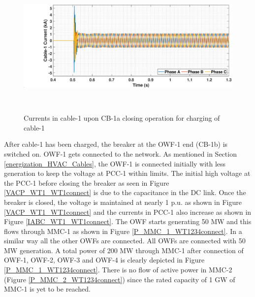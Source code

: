 \begin{figure}[H]
    \includegraphics[height = 7cm,width = \textwidth]{Diagrams/Chapter_5/IABC_Cab1_Cab1charg.eps}
    \caption{Currents in cable-1 upon CB-1a closing operation for charging of cable-1}
    \label{fig:IABC_Cab1_Cab1charg}
\end{figure}

After cable-1 has been charged, the breaker at the \gls{OWF}-1 end (CB-1b) is switched on. \gls{OWF}-1 gets connected to the network. As mentioned in Section \ref{energization_HVAC_Cables}, the \gls{OWF}-1 is connected initially with less generation to keep the voltage at \gls{PCC}-1 within limits. The initial high voltage at the \gls{PCC}-1 before closing the breaker as seen in Figure \ref{VACP_WT1_WT1connect} is due to the capacitance in the DC link. Once the breaker is closed, the voltage is maintained at nearly 1 p.u. as shown in Figure \ref{VACP_WT1_WT1connect} and the currents in \gls{PCC}-1 also increase as shown in Figure \ref{IABC_WT1_WT1connect}. The \gls{OWF} starts generating 50 MW and this flows through \gls{MMC}-1 as shown in Figure \ref{P_MMC_1_WT1234connect}. In a similar way all the other \gls{OWF}s are connected. All \gls{OWF}s are connected with 50 MW generation. A total power of 200 MW through \gls{MMC}-1 after connection of \gls{OWF}-1, \gls{OWF}-2, \gls{OWF}-3 and \gls{OWF}-4 is clearly depicted in Figure \ref{P_MMC_1_WT1234connect}. There is no flow of active power in \gls{MMC}-2 (Figure \ref{P_MMC_2_WT1234connect}) since the rated capacity of 1 GW of \gls{MMC}-1 is yet to be reached.

